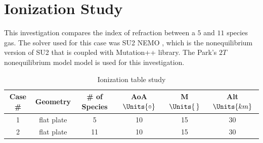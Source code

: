 \section{Ionization Study\label{ch4:ionizationStudy}}
    This investigation compares the index of refraction between a $5$ and $11$
    species gas. The solver used for this case was \gls{SU2} \gls{NEMO}
    \cite{Maier2021}, which is the nonequilibrium version of \gls{SU2} that is
    coupled with \gls{Mutation++} \cite{Scoggins2014} library. The
    Park's $2T$ nonequilibrium model \cite{Park1989} model is used for this
    investigation. 

    \begin{table}[H]
        \centering
        \begin{tabular}{|c|c|c|c|c|c|}
            \hline
            Case \# & Geometry & \# of Species & AoA $\Units{{\circ}}$ & M
            $\Units{\,}$ & Alt $\Units{km}$ \\
            \hline \hline
            1 & flat plate & 5 & 10 & 15 & 30  \\
            \hline
            2 & flat plate & 11 & 10 & 15 & 30  \\
            \hline
        \end{tabular}
        \caption{Ionization table study\label{tab:ionizationTableStudy}}
    \end{table}

